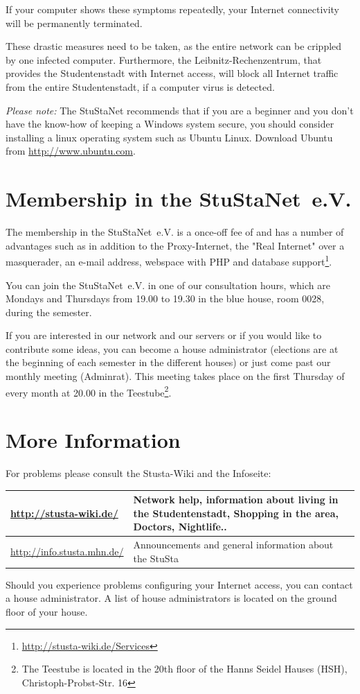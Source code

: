 \documentclass[a4paper,12pt]{scrartcl}
\begin{document}
\begin{em}
If your computer shows these symptoms repeatedly, your Internet connectivity will be permanently terminated.
\end{em}

These drastic measures need to be taken, as the entire network can be crippled by one infected computer. Furthermore, the Leibnitz-Rechenzentrum, that provides the Studentenstadt with Internet access, will block all Internet traffic from the entire Studentenstadt, if a computer virus is detected.

\emph{Please note:} The StuStaNet recommends that if you are a beginner and you don't have the know-how of keeping a Windows system secure, you should consider installing a linux operating system such as Ubuntu Linux. Download Ubuntu from \url{http://www.ubuntu.com}.


\section*{Membership in the StuStaNet~e.V.}

The membership in the StuStaNet~e.V. is a once-off fee of  and has a number of advantages such as in addition to the Proxy-Internet, the "Real Internet" over a masquerader, an e-mail address, webspace with PHP and database support\footnote{\url{http://stusta-wiki.de/Services}}.

You can join the StuStaNet~e.V. in one of our consultation hours, which are Mondays and Thursdays from 19.00 to 19.30 in the blue house, room 0028, during the semester.

If you are interested in our network and our servers or if you would like to contribute some ideas, you can become a house administrator (elections are at the beginning of each semester in the different houses) or just come past our monthly meeting (Adminrat). This meeting takes place on the first Thursday of every month at 20.00 in the Teestube\footnote{The Teestube is located in the 20th floor of the Hanns Seidel Hauses (HSH), Christoph-Probst-Str. 16}.

\section*{More Information}

For problems please consult the Stusta-Wiki and the Infoseite:

\begin{center}
  \begin{tabularx}{\linewidth}{|lX|}
    \hline
    \url{http://stusta-wiki.de/} & Network help, information about living in the Studentenstadt, Shopping in the area, Doctors, Nightlife..\\
    \hline
    \url{http://info.stusta.mhn.de/} & Announcements and general information about the StuSta\\
    \hline
  \end{tabularx}
\end{center}
Should you experience problems configuring your Internet access, you can contact a house administrator. A list of house administrators is located on the ground floor of your house.
\end{document}
